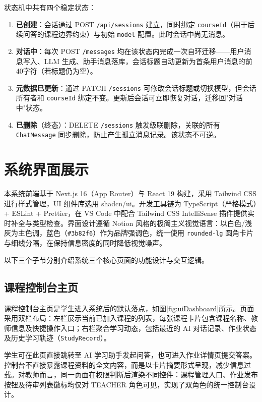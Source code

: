 \documentclass[12pt,a4paper,oneside]{ctexbook}
\numberwithin{equation}{chapter}
\begin{document}
状态机中共有四个稳定状态：

\begin{enumerate}[label=(\arabic*)]
  \item \textbf{已创建}：会话通过 POST \texttt{/api/sessions} 建立，同时绑定 \texttt{courseId}（用于后续问答的课程边界约束）与初始 \texttt{model} 配置。此时会话中尚无消息。
  \item \textbf{对话中}：每次 POST \texttt{/messages} 均在该状态内完成一次自环迁移——用户消息写入、LLM 生成、助手消息落库，会话标题自动更新为首条用户消息的前40字符（若标题仍为空）。
  \item \textbf{元数据已更新}：通过 PATCH \texttt{/sessions} 可修改会话标题或切换模型，但会话所有者和 \texttt{courseId} 绑定不变。更新后会话可立即恢复对话，迁移回"对话中"状态。
  \item \textbf{已删除}（终态）：DELETE \texttt{/sessions} 触发级联删除，关联的所有 \texttt{ChatMessage} 同步删除，防止产生孤立消息记录。该状态不可逆。
\end{enumerate}

\section{系统界面展示}

本系统前端基于 Next.js 16（App Router）与 React 19 构建，采用 Tailwind CSS 进行样式管理，UI 组件库选用 shadcn/ui。开发工具链为 TypeScript（严格模式）+ ESLint + Prettier，在 VS Code 中配合 Tailwind CSS IntelliSense 插件提供实时补全与类型检查。界面设计遵循 Notion 风格的极简主义视觉语言：以白色/浅灰为主色调，蓝色（\texttt{\#3b82f6}）作为品牌强调色，统一使用 \texttt{rounded-lg} 圆角卡片与细线分隔，在保持信息密度的同时降低视觉噪声。

以下三个子节分别介绍系统三个核心页面的功能设计与交互逻辑。

\subsection{课程控制台主页}

课程控制台主页是学生进入系统后的默认落点，如图\ref{fig:uiDashboard}所示。页面采用双栏布局：左栏展示当前已加入课程的列表，每张课程卡片包含课程名称、教师信息及快捷操作入口；右栏聚合学习动态，包括最近的 AI 对话记录、作业状态及历史学习轨迹（\texttt{StudyRecord}）。

学生可在此页直接跳转至 AI 学习助手发起问答，也可进入作业详情页提交答案。控制台不直接暴露课程资料的全文内容，而是以卡片摘要形式呈现，减少信息过载。对教师而言，同一页面在权限判断后渲染不同控件：课程管理入口、作业发布按钮及待审列表徽标均仅对 TEACHER 角色可见，实现了双角色的统一控制台设计。
\end{document}
